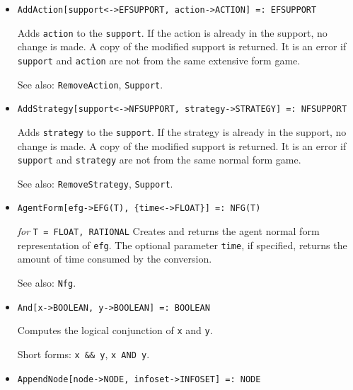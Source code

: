 \begin{itemize}
\item
\protect \large \begin{verbatim} 
AddAction[support<->EFSUPPORT, action->ACTION] =: EFSUPPORT
\end{verbatim}\normalsize

\bd 
Adds \verb+action+ to the \verb+support+.  If the action is already in
the support, no change is made.  A copy of the modified support is
returned.  It is an error if \verb+support+ and \verb+action+ are not from the
same extensive form game.

\item [See also:] \verb+RemoveAction+, \verb+Support+.
\ed

\item
\protect \large \begin{verbatim}
AddStrategy[support<->NFSUPPORT, strategy->STRATEGY] =: NFSUPPORT
\end{verbatim}\normalsize

\bd
Adds \verb+strategy+ to the \verb+support+.  If the strategy is already
in the support, no change is made.  A copy of the modified support is
returned.  It is an error if \verb+support+ and \verb+strategy+ are not
from the same normal form game.

\item [See also:] \verb+RemoveStrategy+, \verb+Support+.
\ed

\item
\protect \large \begin{verbatim}
AgentForm[efg->EFG(T), {time<->FLOAT}] =: NFG(T)
\end{verbatim}\normalsize

{\it for} {\tt T = FLOAT, RATIONAL}
\bd
Creates and returns the agent normal form representation of \verb+efg+.
The optional parameter \verb+time+, if specified, returns the amount
of time consumed by the conversion.

\item [See also:] \verb+Nfg+.
\ed

\item 
\protect \large \begin{verbatim}
And[x->BOOLEAN, y->BOOLEAN] =: BOOLEAN
\end{verbatim} \normalsize

\bd
Computes the logical conjunction of \verb+x+ and \verb+y+.
\item
[Short forms:] \verb+x && y+, \verb+x AND y+.
\ed

\item
\protect \large \begin{verbatim} 
AppendNode[node->NODE, infoset->INFOSET] =: NODE
\end{verbatim}\normalsize


\end{itemize}
